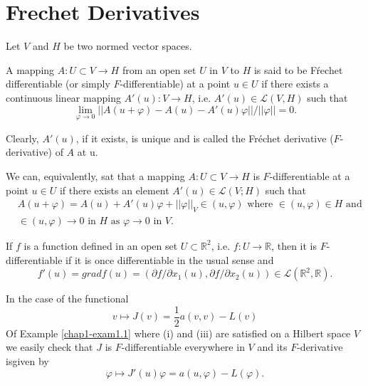 \section{Frechet Derivatives}\label{chap1-sec6}
Let $V$ and $H$ be two normed vector spaces.

\begin{definition}\label{chap1-def6.1}
A mapping $A : U \subset V \to H$ from an open set $U$ in $V$ to $H$ is said to be F\'{r}echet differentiable (or simply $F$-differentiable) at a point $u \in U$ if there exists a continuous linear mapping $A' (u) : V \to H$, i.e. $A'(u) \in \mathscr{L} (V , H)$ such that
\begin{equation*}
 \lim_{\varphi \to 0} ||A(u + \varphi) - A(u) - A'(u) \varphi||/ ||\varphi|| = 0.\tag{6.1}\label{chap1-eq6.1}
\end{equation*}
\end{definition}\pageoriginale

Clearly, $A'(u)$, if it exists, is unique and is called the Fr\'{e}chet derivative ($F$-derivative) of $A$ at u.

We can, equivalently, sat that a mapping $A : U \subset V \to H$ is $F$-differentiable at a point $u \in U$ if there exists an element $A'(u) \in \mathscr{L}(V ; H)$ such that
\begin{align*}
& A(u + \varphi) = A(u) + A'(u)\varphi + ||\varphi||_{V} \in (u, \varphi) \text{ where } \in(u, \varphi) \in H \text{ and }\\
&  \in(u, \varphi) \to 0 \text{ in } H \text{ as } \varphi \to 0 \text{ in } V.\tag{6.2}\label{chap1-eq6.2}
\end{align*}

\begin{example}\label{chap1-exam6.1}
If $f$ is a function defined in an open set $U \subset \mathbb{R}^{2}$, i.e. $f : U \to \mathbb{R}$, then it is $F$-differentiable if it is once differentiable in the usual sense and
$$
f'(u) = grad f(u) = (\partial f / \partial x_{1} (u), \partial f/ \partial x_{2} (u)) \in \mathscr{L} (\mathbb{R}^{2}, \mathbb{R}).
$$ 
\end{example}

\begin{example}\label{chap1-exam6.2}
In the case of the functional 
$$
v \mapsto J(v) = \frac{1}{2} a(v, v) - L(v)
$$
Of Example \ref{chap1-exam1.1} where (i) and (iii) are satisfied on a Hilbert space $V$ we easily check that $J$ is $F$-differentiable everywhere in $V$ and its $F$-derivative isgiven by
$$
\varphi \mapsto J'(u) \varphi = a(u, \varphi) - L(\varphi).
$$
\end{example}

